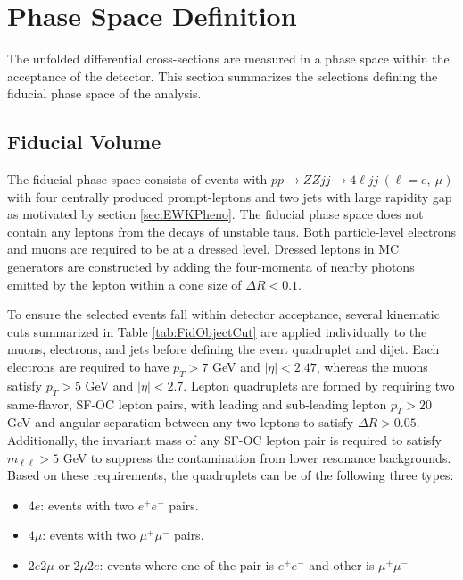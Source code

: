 \section{Phase Space Definition}
\label{sec:FidSel}

The unfolded differential cross-sections are measured in a phase space within the acceptance of the detector. This section summarizes the selections defining the fiducial phase space of the analysis.

\subsection{Fiducial Volume}
\label{subsec:FidVol} 

The fiducial phase space consists of events with $pp\rightarrow ZZjj \rightarrow 4\ell jj ~(\ell = e,~\mu)$ with four centrally produced prompt-leptons and two jets with large rapidity gap as motivated by section \ref{sec:EWKPheno}. The fiducial phase space does not contain any leptons from the decays of unstable taus. Both particle-level electrons and muons are required to be at a dressed level. Dressed leptons in MC generators are constructed by adding the four-momenta of nearby photons emitted by the lepton within a cone size of $\Delta R < 0.1$. 

To ensure the selected events fall within detector acceptance, several kinematic cuts summarized in Table \ref{tab:FidObjectCut} are applied individually to the muons, electrons, and jets before defining the event quadruplet and dijet. Each electrons are required to have $p_{T} > 7$ GeV and $|\eta| < 2.47$, whereas the muons satisfy $p_{T} > 5$ GeV and $|\eta| < 2.7$. Lepton quadruplets are formed by requiring two same-flavor, SF-OC lepton pairs, with leading and sub-leading lepton $p_{T}>20$ GeV and angular separation between any two leptons to satisfy $\Delta R > 0.05$. Additionally, the invariant mass of any SF-OC lepton pair is required to satisfy $m_{\ell \ell } > 5$ GeV to suppress the contamination from lower resonance backgrounds. Based on these requirements, the quadruplets can be of the following three types:

\begin{itemize}
\item{$4e$: events with two $e^{+}e^{-}$ pairs.}
\item{$4\mu$: events with two $\mu^{+}\mu^{-}$ pairs.}
\item{$2e2\mu$ or $2\mu2e$: events where one of the pair is $e^{+}e^{-}$ and other is $\mu^{+}\mu^{-}$}
\end{itemize}

